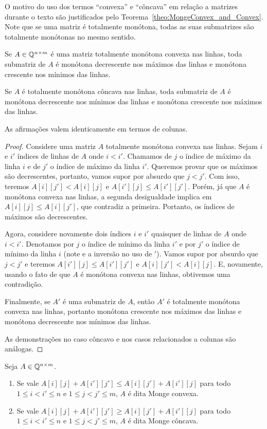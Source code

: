 O motivo do uso dos termos ``convexa'' e ``côncava'' em relação a matrizes durante o texto são justificados pelo Teorema~\ref{theo:MongeConvex_and_Convex}. Note que se uma matriz é totalmente monótona, todas as suas submatrizes são totalmente monótonas no mesmo sentido.

\begin{lema} \label{lema:MonotoneTotallyMonotone}
Se $A \in \mathbb{Q}^{n \times m}$ é uma matriz totalmente monótona convexa nas linhas, toda submatriz de $A$ é monótona decrescente nos máximos das linhas e monótona crescente nos mínimos das linhas.  

Se $A$ é totalmente monótona côncava nas linhas, toda submatriz de $A$ é monótona decrescente nos mínimos das linhas e monótona crescente nos máximos das linhas.  

As afirmações valem identicamente em termos de colunas.
\end{lema}

\begin{proof}
Considere uma matriz $A$ totalmente monótona convexa nas linhas. Sejam $i$ e $i'$ índices de linhas de $A$ onde $i < i'$. Chamamos de $j$ o índice de máximo da linha $i$ e de $j'$ o índice de máximo da linha $i'$. Queremos provar que os máximos são decrescentes, portanto, vamos supor por absurdo que $j < j'$. Com isso, teremos $A[i][j'] < A[i][j]$ e $A[i'][j] \leq A[i'][j']$. Porém, já que $A$ é monótona convexa nas linhas, a segunda desigualdade implica em $A[i][j] \leq A[i][j']$, que contradiz a primeira. Portanto, os índices de máximos são decrescentes.  

Agora, considere novamente dois índices $i$ e $i'$ quaisquer de linhas de $A$ onde $i < i'$. Denotamos por $j$ o índice de mínimo da linha $i'$ e por $j'$ o índice de mínimo da linha $i$ (note e a inversão no uso de $'$). Vamos supor por absurdo que $j < j'$ e teremos $A[i'][j] \leq A[i'][j']$ e $A[i][j'] < A[i][j]$. E, novamente, usando o fato de que $A$ é monótona convexa nas linhas, obtivemos uma contradição.  

Finalmente, se $A'$ é uma submatriz de $A$, então $A'$ é totalmente monótona convexa nas linhas, portanto monótona crescente nos máximos das linhas e monótona decrescente nos mínimos das linhas.

As demonstrações no caso côncavo e nos casos relacionados a colunas são análogas.
\end{proof}

\begin{defi} \label{defi:MatrizMonge}
Seja $A \in \mathbb{Q}^{n \times m}$.
    \begin{enumerate}
        \item Se vale $A[i][j] + A[i'][j'] \leq A[i][j'] + A[i'][j]$ para todo $1 \leq i < i' \leq n$ e $1 \leq j < j' \leq m$, $A$ é dita Monge convexa.
        \item Se vale $A[i][j] + A[i'][j'] \geq A[i][j'] + A[i'][j]$ para todo $1 \leq i < i' \leq n$ e $1 \leq j < j' \leq m$, $A$ é dita Monge côncava.
    \end{enumerate}
\end{defi}

